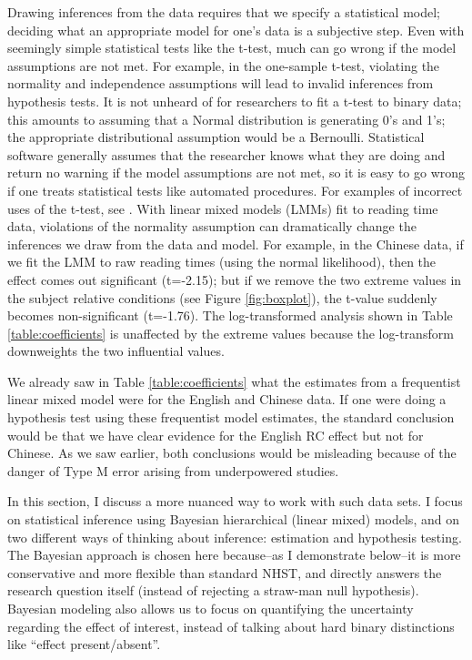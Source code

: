 \documentclass{ar-1col}\usepackage[]{graphicx}\usepackage[]{color}
\begin{document}
Drawing inferences from the data requires that we specify a statistical model; deciding what an appropriate model for one's data is a subjective step. Even with seemingly simple statistical tests like the t-test,  much can go wrong if the model assumptions are not met. For example, in the one-sample t-test, violating the normality and independence assumptions will lead to invalid inferences from hypothesis tests. It is not unheard of for researchers to fit a t-test to binary data; this amounts to assuming that a Normal distribution is generating 0's and 1's; the appropriate distributional assumption would be a Bernoulli. Statistical software generally assumes that the researcher knows what they are doing and return no warning if the model assumptions are not met, so it is easy to go wrong if one treats statistical tests like automated procedures. For examples of incorrect uses of the t-test, see \citet{NicenboimRoettgeretal,VasishthEtAlFreq2019}. With linear mixed models (LMMs) fit to reading time data, violations of the normality assumption  can dramatically change the inferences we draw from the data and model. For example, in the Chinese data, if we fit the LMM to raw reading times (using the normal likelihood), then the effect comes out significant (t=-2.15); but if we remove the two extreme values in the subject relative conditions (see Figure \ref{fig:boxplot}), the t-value suddenly becomes non-significant (t=-1.76). The log-transformed analysis shown in Table \ref{table:coefficients} is unaffected by the extreme values because the log-transform downweights the two influential values.

We already saw in Table \ref{table:coefficients} what the estimates from a frequentist linear mixed model were for the English and Chinese data. If one were doing a hypothesis test using these frequentist model estimates, the standard conclusion would be that we have clear evidence for the English RC effect but not for Chinese. As we saw earlier, both conclusions would be misleading because of the danger of Type M error arising from underpowered studies.

In this section, I discuss a more nuanced way to work with such data sets. I focus on statistical inference using Bayesian hierarchical (linear mixed) models, and on two different ways of thinking about inference: estimation and hypothesis testing. The Bayesian approach is chosen here because--as I demonstrate below--it is more conservative and more flexible than standard NHST, and directly answers the research question itself (instead of rejecting a straw-man null hypothesis). Bayesian modeling also allows us to focus on quantifying the uncertainty regarding the effect of interest, instead of talking about hard binary distinctions like ``effect present/absent''.
\end{document}
